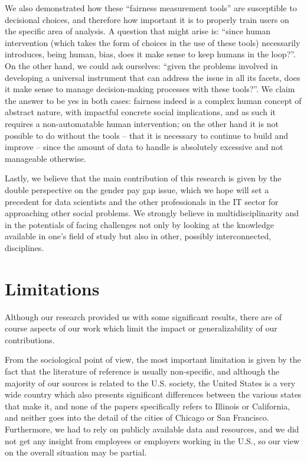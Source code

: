 We also demonstrated how these ``fairness measurement tools'' are susceptible to decisional choices, and therefore how important it is to properly train users on the specific area of analysis. A question that might arise is: ``since human intervention (which takes the form of choices in the use of these tools) necessarily introduces, being human, bias, does it make sense to keep humans in the loop?''. On the other hand, we could ask ourselves: ``given the problems involved in developing a universal instrument that can address the issue in all its facets, does it make sense to manage decision-making processes with these tools?''. We claim the answer to be yes in both cases: fairness indeed is a complex human concept of abstract nature, with impactful concrete social implications, and as such it requires a non-automatable human intervention; on the other hand it is not possible to do without the tools -- that it is necessary to continue to build and improve -- since the amount of data to handle is absolutely excessive and not manageable otherwise.

Lastly, we believe that the main contribution of this research is given by the double perspective on the gender pay gap issue, which we hope will set a precedent for data scientists and the other professionals in the IT sector for approaching other social problems. We strongly believe in multidisciplinarity and in the potentials of facing challenges not only by looking at the knowledge available in one's field of study but also in other, possibly interconnected, disciplines.


\section{Limitations}
\label{section:limitations}
Although our research provided us with some significant results, there are of course aspects of our work which limit the impact or generalizability of our contributions.

From the sociological point of view, the most important limitation is given by the fact that the literature of reference is usually non-specific, and although the majority of our sources is related to the U.S. society, the United States is a very wide country which also presents significant differences between the various states that make it, and none of the papers specifically refers to Illinois or California, and neither goes into the detail of the cities of Chicago or San Francisco. Furthermore, we had to rely on publicly available data and resources, and we did not get any insight from employees or employers working in the U.S., so our view on the overall situation may be partial.

